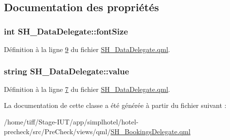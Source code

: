 \subsection{Documentation des propriétés}
\hypertarget{classSH__DataDelegate_afbb41ad9b513c7f27e7b5ad90d82e95b}{
\subsubsection[{font\-Size}]{\setlength{\rightskip}{0pt plus 5cm}int S\-H\-\_\-\-Data\-Delegate\-::font\-Size\hspace{0.3cm}{\ttfamily [inherited]}}}\label{classSH__DataDelegate_afbb41ad9b513c7f27e7b5ad90d82e95b}


Définition à la ligne \hyperlink{SH__DataDelegate_8qml_source_l00009}{9} du fichier \hyperlink{SH__DataDelegate_8qml_source}{S\-H\-\_\-\-Data\-Delegate.\-qml}.

\hypertarget{classSH__DataDelegate_acb9da3c73493c88865e08d9575f26482}{
\subsubsection[{value}]{\setlength{\rightskip}{0pt plus 5cm}string S\-H\-\_\-\-Data\-Delegate\-::value\hspace{0.3cm}{\ttfamily [inherited]}}}\label{classSH__DataDelegate_acb9da3c73493c88865e08d9575f26482}


Définition à la ligne \hyperlink{SH__DataDelegate_8qml_source_l00007}{7} du fichier \hyperlink{SH__DataDelegate_8qml_source}{S\-H\-\_\-\-Data\-Delegate.\-qml}.



La documentation de cette classe a été générée à partir du fichier suivant \-:\begin{DoxyCompactItemize}
\item 
/home/tiff/\-Stage-\/\-I\-U\-T/app/simplhotel/hotel-\/precheck/src/\-Pre\-Check/views/qml/\hyperlink{SH__BookingsDelegate_8qml}{S\-H\-\_\-\-Bookings\-Delegate.\-qml}\end{DoxyCompactItemize}
